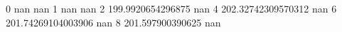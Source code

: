 0 nan nan
1 nan nan
2 199.9920654296875 nan
4 202.32742309570312 nan
6 201.74269104003906 nan
8 201.597900390625 nan

